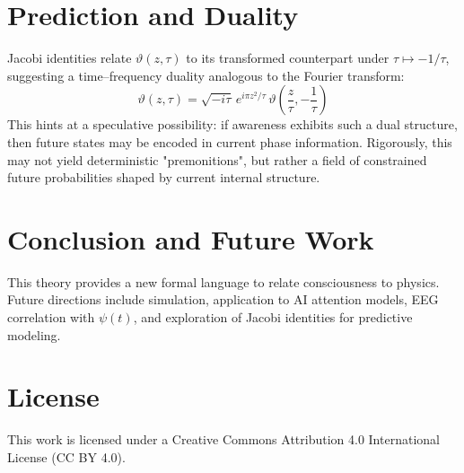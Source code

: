 \documentclass[12pt]{article}
\begin{document}
\section{Prediction and Duality}

Jacobi identities relate $\vartheta(z, \tau)$ to its transformed counterpart under $\tau \mapsto -1/\tau$, suggesting a time--frequency duality analogous to the Fourier transform:
\[
\vartheta(z, \tau) = \sqrt{-i\tau} \, e^{i\pi z^2/\tau} \, \vartheta\left(\frac{z}{\tau}, -\frac{1}{\tau}\right)
\]
This hints at a speculative possibility: if awareness exhibits such a dual structure, then future states may be encoded in current phase information. Rigorously, this may not yield deterministic "premonitions", but rather a field of constrained future probabilities shaped by current internal structure.

\section{Conclusion and Future Work}

This theory provides a new formal language to relate consciousness to physics. Future directions include simulation, application to AI attention models, EEG correlation with $\psi(t)$, and exploration of Jacobi identities for predictive modeling.




\section*{License}
This work is licensed under a Creative Commons Attribution 4.0 International License (CC BY 4.0).
\end{document}
